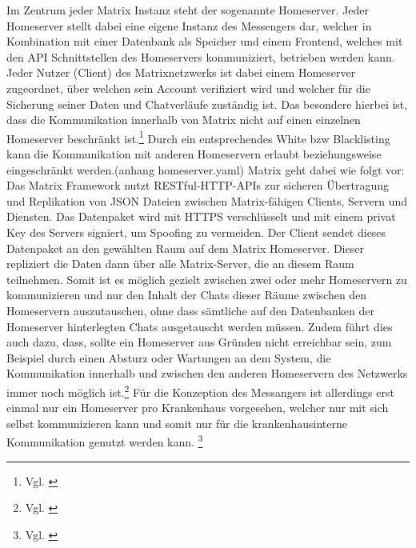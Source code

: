 Im Zentrum jeder Matrix Instanz steht der sogenannte Homeserver. Jeder Homeserver stellt dabei eine eigene Instanz des Messengers dar, welcher in Kombination mit einer Datenbank als Speicher und einem Frontend, welches mit den API Schnittstellen des Homeservers kommuniziert, betrieben werden kann. Jeder Nutzer (Client) des Matrixnetzwerks ist dabei einem Homeserver zugeordnet, über welchen sein Account verifiziert wird und welcher für die Sicherung seiner Daten und Chatverläufe zuständig ist. Das besondere hierbei ist, dass die Kommunikation innerhalb von Matrix nicht auf einen einzelnen Homeserver beschränkt ist.\footnote{Vgl. \cite{Github2020}} Durch ein entsprechendes White bzw Blacklisting kann die Kommunikation mit anderen Homeservern erlaubt beziehungsweise eingeschränkt werden.(anhang homeserver.yaml) Matrix geht dabei wie folgt vor:
Das Matrix Framework nutzt RESTful-HTTP-APIs zur sicheren Übertragung und Replikation von JSON Dateien zwischen Matrix-fähigen Clients, Servern und Diensten. Das Datenpaket wird mit HTTPS verschlüsselt und mit einem privat Key des Servers signiert, um Spoofing zu vermeiden.
Der Client sendet dieses Datenpaket an den gewählten \glqq Raum\grqq{} auf dem Matrix Homeserver. Dieser repliziert die Daten dann über alle Matrix-Server, die an diesem \glqq Raum\grqq{} teilnehmen. Somit ist es möglich gezielt zwischen zwei oder mehr Homeservern zu kommunizieren und nur den Inhalt der Chats dieser Räume zwischen den Homeservern auszutauschen, ohne dass sämtliche auf den Datenbanken der Homeserver hinterlegten Chats ausgetauscht werden müssen. Zudem führt dies auch dazu, dass, sollte ein Homeserver aus Gründen nicht erreichbar sein, zum Beispiel durch einen Absturz oder Wartungen an dem System, die Kommunikation innerhalb und zwischen den anderen Homeservern des Netzwerks immer noch möglich ist.\footnote{Vgl. \cite{Github2020}} Für die Konzeption des Messangers ist allerdings erst einmal nur ein Homeserver pro Krankenhaus vorgesehen, welcher nur mit sich selbst kommunizieren kann und somit nur für die krankenhausinterne Kommunikation genutzt werden kann. \footnote{Vgl. \cite{Matirx.org-specifications2020}}

